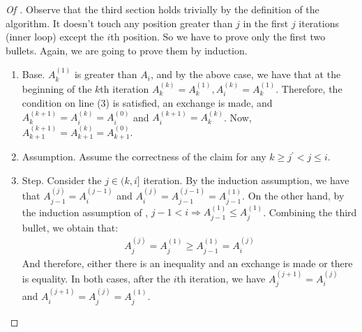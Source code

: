   \begin{proof}[Of ]
  Observe that the third section holds trivially by the definition of the algorithm. It doesn't touch any position greater than $j$ in the first $j$ iterations (inner loop) except the $i$th position. So we have to prove only the first two bullets. Again, we are going to prove them by induction.  
  \begin{enumerate}
    \item Base. $A^{(1)}_{k}$ is greater than $A_{i}$, and by the above case, we have that at the beginning of the $k$th iteration $A^{(k)}_{k}=A^{(1)}_{k}, A^{(k)}_{i}=A^{(1)}_{k}$. Therefore, the condition on line (3) is satisfied, an exchange is made, and $A^{(k+1)}_{k} =A^{(k)}_{i} = A^{(0)}_{i}$ and $A^{(k+1)}_{i} = A^{(k)}_{k}$. Now, $A^{(k+1)}_{k+1} = A^{(k)}_{k+1} = A^{(0)}_{k+1}$.
    \item Assumption. Assume the correctness of the claim for any $k\ge j^{\prime} < j \le i$. 
    \item Step. Consider the $j \in (k,i]$ iteration. By the induction assumption, we have that $A^{(j)}_{j-1} = A^{(j-1)}_{i}$ and $A^{(j)}_{i} = A^{(j-1)}_{j-1} = A^{(1)}_{j-1}$. On the other hand, by the induction assumption of , $j-1 < i \Rightarrow A^{(1)}_{j-1} \le A^{(1)}_{j}$. Combining the third bullet, we obtain that:                
      \begin{equation*}
        \begin{split}
          A^{(j)}_{j} = A^{(1)}_{j} \ge A^{(1)}_{j-1} = A^{(j)}_{i}
        \end{split}
      \end{equation*}
      And therefore, either there is an inequality and an exchange is made or there is equality. In both cases, after the $i$th iteration, we have $A^{(j+1)}_{j} = A^{(j)}_{i}$ and $A^{(j+1)}_{i} = A^{(j)}_{j} = A^{(1)}_{j}$.
  \end{enumerate}
\end{proof}
% 
%
